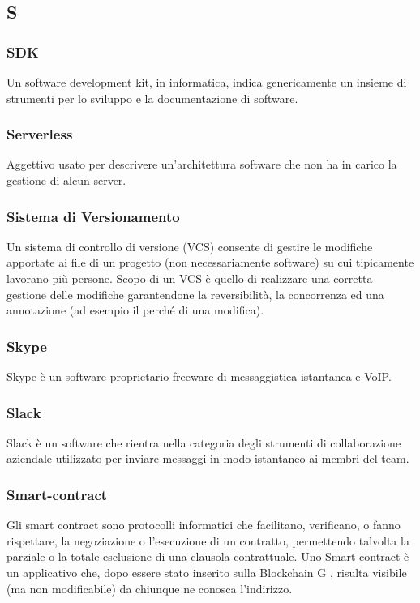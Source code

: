 \subsection*{\textbf{\hfill \Huge{S} \hfill}} 
\subsubsection*{SDK}
Un software development kit, in informatica, indica genericamente un insieme di strumenti per lo sviluppo e la documentazione di software.
\subsubsection*{Serverless}
Aggettivo usato per descrivere un’architettura software che non ha in carico la gestione di alcun server.
\subsubsection*{Sistema di Versionamento}
Un sistema di controllo di versione (VCS) consente di gestire le modifiche apportate ai file di un progetto (non necessariamente software) su cui tipicamente lavorano più persone. Scopo di un VCS è quello di realizzare una corretta gestione delle modifiche garantendone la reversibilità, la concorrenza ed una annotazione (ad esempio il perché di una modifica).
\subsubsection*{Skype}
Skype è un software proprietario freeware di messaggistica istantanea e VoIP.
\subsubsection*{Slack}
Slack è un software che rientra nella categoria degli strumenti di collaborazione aziendale utilizzato per inviare messaggi in modo istantaneo ai membri del team.
\subsubsection*{Smart-contract}
Gli smart contract sono protocolli informatici che facilitano, verificano, o fanno rispettare, la negoziazione o l’esecuzione di un contratto, permettendo talvolta la parziale o la totale esclusione di una clausola contrattuale. Uno Smart contract è un applicativo che, dopo essere stato inserito sulla Blockchain G , risulta visibile (ma non modificabile) da chiunque ne conosca l’indirizzo.
